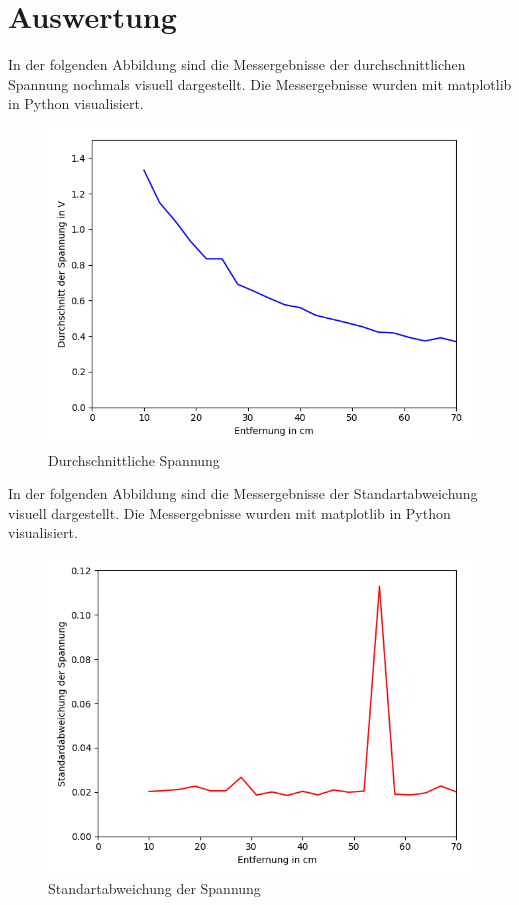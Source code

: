 \documentclass[12pt, oneside, a4paper, \docLanguage]{report}
\begin{document}
\newpage
\section{Auswertung}
\label{chap:VERSUCH_1_AUSWERTUNG}
In der folgenden Abbildung sind die Messergebnisse der durchschnittlichen Spannung nochmals visuell dargestellt. Die Messergebnisse wurden mit matplotlib in Python visualisiert.

\begin{figure}[H]
	\centering\small
	\includegraphics[width=\textwidth]{media/myplot.png}
	\caption{Durchschnittliche Spannung}
	\label{fig:VERSUCH_1_PLOT_DURCHSCNITTLICHE_SAPNNUNG}
\end{figure}

\newpage
In der folgenden Abbildung sind die Messergebnisse der Standartabweichung visuell dargestellt. Die Messergebnisse wurden mit matplotlib in Python visualisiert.

\begin{figure}[H]
	\centering\small
	\includegraphics[width=\textwidth]{media/myplot2.png}
	\caption{Standartabweichung der Spannung}
	\label{fig:VERSUCH_1_PLOT_STANDARTABWEICHUNG}
\end{figure}
\end{document}
